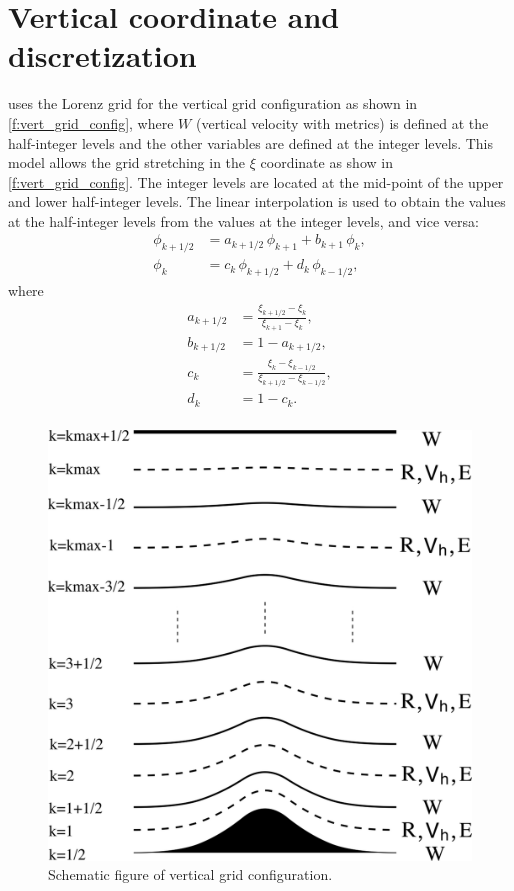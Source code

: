 \section{Vertical coordinate and discretization}\label{s:vert_coord}

\NICAM uses the Lorenz grid for the vertical grid configuration as shown
in \autoref{f:vert_grid_config},
where $W$ (vertical velocity with metrics) is defined at the
half-integer levels and the other variables are defined at the integer
levels.
%
This model allows the grid stretching in the $\xi$ coordinate as show in
\autoref{f:vert_grid_config}.
%
The integer levels are located at the mid-point of the upper and lower
half-integer levels.
%
The linear interpolation is used to obtain the values at the
half-integer levels from the values at the integer levels, and vice
versa:
%
\begin{align}
 \phi_{k+1/2} &= a_{k+1/2}\, \phi_{k+1} + b_{k+1}\,\phi_k,\\
 \phi_k       &= c_k \, \phi_{k+1/2} + d_k \, \phi_{k-1/2},
\end{align}
%
where
%
\begin{align}
 a_{k+1/2} &= \frac{\xi_{k+1/2} - \xi_k}{\xi_{k+1}-\xi_k},\\
 b_{k+1/2} &= 1 - a_{k+1/2} ,\\
 c_k       &= \frac{\xi_k - \xi_{k-1/2} }{\xi_{k+1/2} - \xi_{k-1/2}},\\
 d_k       &= 1 - c_k.\\
\end{align}


\begin{figure}[tb]
\centering
\includegraphics[scale=.4]{./figs/Tomita1-23-1.png}
\caption{Schematic figure of vertical grid configuration.}
\label{f:vert_grid_config}
\end{figure}


